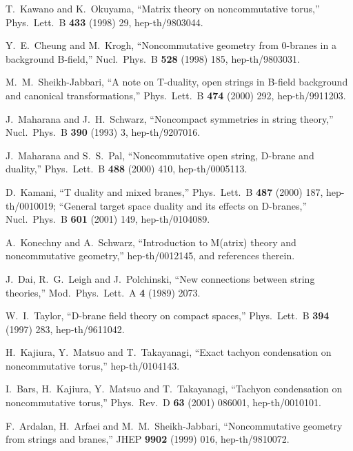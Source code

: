 \documentclass[a4paper,12pt]{article}
\begin{document}
\begin{thebibliography}{99}
T.~Kawano and K.~Okuyama,
``Matrix theory on noncommutative torus,''
Phys.\ Lett.\ B {\bf 433} (1998) 29, 
hep-th/9803044.



Y.~E.~Cheung and M.~Krogh,
``Noncommutative geometry from 0-branes in a background B-field,''
Nucl.\ Phys.\ B {\bf 528} (1998) 185, 
hep-th/9803031.



M.~M.~Sheikh-Jabbari,
``A note on T-duality, open strings in B-field background 
and canonical  transformations,''
Phys.\ Lett.\ B {\bf 474} (2000) 292, 
hep-th/9911203.



J.~Maharana and J.~H.~Schwarz,
``Noncompact symmetries in string theory,''
Nucl.\ Phys.\ B {\bf 390} (1993) 3, 
hep-th/9207016.



J.~Maharana and S.~S.~Pal,
``Noncommutative open string, D-brane and duality,''
Phys.\ Lett.\ B {\bf 488} (2000) 410, 
hep-th/0005113.



D.~Kamani, 
``T duality and mixed branes,''
Phys.\ Lett.\ B {\bf 487} (2000) 187, 
hep-th/0010019; 
``General target space duality and its effects on D-branes,''
Nucl.\ Phys.\ B {\bf 601} (2001) 149, 
hep-th/0104089.



A.~Konechny and A.~Schwarz,
``Introduction to M(atrix) theory and noncommutative geometry,''
hep-th/0012145, and references therein.



J.~Dai, R.~G.~Leigh and J.~Polchinski,
``New connections between string theories,''
Mod.\ Phys.\ Lett.\ A {\bf 4} (1989) 2073.



W.~I.~Taylor,
``D-brane field theory on compact spaces,'' 
Phys.\ Lett.\ B {\bf 394} (1997) 283, 
hep-th/9611042.



H.~Kajiura, Y.~Matsuo and T.~Takayanagi,
``Exact tachyon condensation on noncommutative torus,''
hep-th/0104143.



I.~Bars, H.~Kajiura, Y.~Matsuo and T.~Takayanagi,
``Tachyon condensation on noncommutative torus,''
Phys.\ Rev.\ D {\bf 63} (2001) 086001, 
hep-th/0010101.



F.~Ardalan, H.~Arfaei and M.~M.~Sheikh-Jabbari,
``Noncommutative geometry from strings and branes,''
JHEP {\bf 9902} (1999) 016,
hep-th/9810072.



\end{thebibliography}
\end{document}
